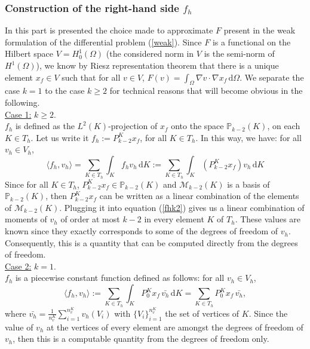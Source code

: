 \subsubsection{Construction of the right-hand side $f_h$}
In this part is presented the choice made to approximate $F$ present in the weak formulation of the differential problem (\ref{weak}). Since $F$ is a functional on the Hilbert space $V=H_0^1(\Omega)$ (the considered norm in $V$ is the semi-norm of $H^1(\Omega)$), we know by Riesz representation theorem that there is a unique element $x_f\in V$ such that for all $v\in V$, $F(v) = \int_\Omega \nabla v\cdot\nabla x_f\, \mathrm{d}\Omega$. We separate the case $k=1$ to the case $k\geq 2$ for technical reasons that will become obvious in the following.\\

\noindent \underline{Case 1:} $k\geq 2$. \\
$f_h$ is defined as the $L^2(K)$-projection of $x_f$ onto the space $\mathbb{P}_{k-2}(K)$, on each $K\in T_h$. Let us write it $f_h := P_{k-2}^Kx_f$, for all $K\in T_h$. In this way, we have: for all $v_h\in V_h$, 
\begin{equation} \label{fhk2}
\langle f_h, v_h \rangle = \sum_{K\in T_h} \int_K f_h v_h \, \mathrm{d}K := \sum_{K\in T_h}\int_K \left(P_{k-2}^Kx_f\right)v_h\, \mathrm{d}K
\end{equation}
Since for all $K\in T_h$, $P_{k-2}^Kx_f\in \mathbb{P}_{k-2}(K)$ and $\mathcal{M}_{k-2}(K)$ is a basis of $\mathbb{P}_{k-2}(K)$, then $P_{k-2}^Kx_f$ can be written as a linear combination of the elements of $\mathcal{M}_{k-2}(K)$. Plugging it into equation (\ref{fhk2}) gives us a linear combination of moments of $v_h$ of order at most $k-2$ in every element $K$ of $T_h$. These values are known since they exactly corresponds to some of the degrees of freedom of $v_h$. Consequently, this is a quantity that can be computed directly from the degrees of freedom. \\

\noindent \underline{Case 2:} $k=1$. \\
$f_h$ is a piecewise constant function defined as follows: for all $v_h\in V_h$, 
$$\langle f_h, v_h \rangle := \sum_{K\in T_h} \int_K P_0^Kx_f\, \bar{v_h} \,\mathrm{d}K = \sum_{K\in T_h}P_0^Kx_f\,\bar{v_h},$$
where $\bar{v_h} = \frac{1}{n_v^K}\sum_{i=1}^{n_v^K}v_h(V_i)$ with $\{V_i\}_{i=1}^{n_v^K}$ the set of vertices of $K$. 
Since the value of $v_h$ at the vertices of every element are amongst the degrees of freedom of $v_h$, then this is a computable quantity from the degrees of freedom only. \\

